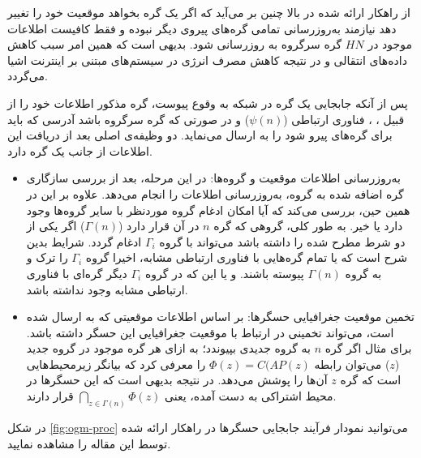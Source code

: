 \par
از راهکار ارائه شده در بالا چنین بر می‌آید که اگر یک گره بخواهد موقعیت خود را تغییر دهد نیازمند به‌روزرسانی تمامی گره‌های پیروی دیگر نبوده و فقط کافیست اطلاعات موجود در $HN$ گره سرگروه به روزرسانی شود. بدیهی است که همین امر سبب کاهش داده‌های انتقالی و در نتیجه کاهش مصرف انرژی در سیستم‌های مبتنی بر اینترنت اشیا می‌گردد.

\par
پس از آنکه جابجایی یک گره در شبکه به وقوع پیوست، گره مذکور اطلاعات خود را از قبیل ، 
،
فناوری ارتباطی ($\psi(n)$)
و در صورتی که گره سرگروه باشد آدرسی که باید برای گره‌های پیرو  شود را به  ارسال می‌نماید.  دو وظیفه‌ی اصلی بعد از دریافت این اطلاعات از جانب یک گره دارد.

\begin{itemize}
\item{
به‌روزرسانی اطلاعات موقعیت و گروه‌ها: در این مرحله،  بعد از بررسی سازگاری گره اضافه شده به گروه، به‌روزرسانی اطلاعات را انجام می‌دهد. علاوه بر این در همین حین،  بررسی می‌کند که آیا امکان ادغام گروه موردنظر با سایر گروه‌ها وجود دارد یا خیر. به طور کلی، گروهی که گره $n$ در آن قرار دارد 
($\Gamma(n)$)
 اگر یکی از دو شرط مطرح شده را داشته باشد می‌تواند با گروه $\Gamma_i$ ادغام گردد. شرایط بدین شرح است که یا تمام گره‌هایی با فناوری ارتباطی مشابه، اخیرا گروه $\Gamma_i$ را ترک و به گروه $\Gamma(n)$ پیوسته باشند. و یا این که در گروه $\Gamma_i$ دیگر گره‌ای با فناوری ارتباطی مشابه وجود نداشته باشد.
}
\item{
تخمین موقعیت جغرافیایی حسگرها: بر اساس اطلاعات موقعیتی که به  ارسال شده است،  می‌تواند تخمینی در ارتباط با موقعیت جغرافیایی این حسگر داشته باشد. برای مثال اگر گره $n$ به گروه جدیدی بپیوندد؛ به ازای هر گره موجود در گروه جدید ($z$) می‌توان رابطه $\Phi(z) = C(AP(z)$ را معرفی کرد که بیانگر زیرمحیط‌هایی است که گره $z$ آن‌ها را پوشش می‌دهد. در نتیجه بدیهی است که این حسگرها در محیط اشتراکی به دست آمده، یعنی $\bigcap_{z \in \Gamma(n)} \Phi(z)$ قرار دارند. 
}
\end{itemize}

\par
در شکل \ref{fig:ogm-proc} می‌توانید نمودار فرآیند جابجایی حسگرها در راهکار ارائه شده توسط این مقاله را مشاهده نمایید.

